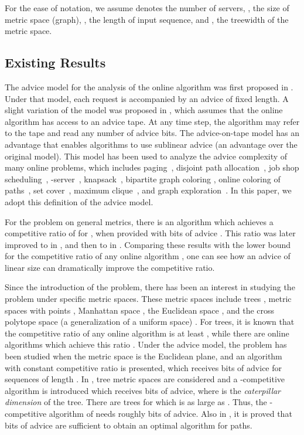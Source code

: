 For the ease of notation, we assume  denotes the number of servers, , the size of metric space (graph), , the length of input sequence, and , the treewidth of the metric space. 

\subsection{Existing Results}

The advice model for the analysis of the online algorithm was first proposed in \cite{Emek2011}. Under that model, each request is accompanied by an advice of fixed length. A slight variation of the model was proposed in \cite{ISSAC09,Bock11}, which assumes that the online algorithm has access to an advice tape. At any time step, the algorithm may refer to the tape and read any number of advice bits. 
The advice-on-tape model has an advantage that enables algorithms to use sublinear advice (an advantage over the original model). This model has been used to analyze the advice complexity of many online problems, which includes paging~\cite{ISSAC09,MFCS10,SOFSEM11}, 
disjoint path allocation~\cite{ISSAC09}, job shop scheduling~\cite{ISSAC09,SOFSEM11}, -server~\cite{Bock11}, knapsack~\cite{LATIN12}, bipartite graph coloring \cite{COCOON12}, online coloring of paths~\cite{LATA12}, 
set cover~\cite{CSR12,ECCC12}, maximum clique~\cite{ECCC12}, and graph exploration~\cite{SIROCCO12}. In this paper, we adopt this definition of the advice model.

For the \kc problem on general metrics, there is an algorithm which achieves a competitive ratio of  for , when provided with  bits of advice \cite{Emek2011}. This ratio was later improved to  in \cite{Bock11}, and then to  in \cite{WAOA11}. Comparing these results with the lower bound  for the competitive ratio of any online algorithm \cite{Mana88}, one can see how an advice of linear size can dramatically improve the competitive ratio. 

Since the introduction of the \kc problem, there has been an interest in studying the problem under specific metric spaces. These metric spaces include trees \cite{Chrob91}, metric spaces with  points \cite{Bart00}, Manhattan space \cite{Bein02}, the Euclidean space \cite{Bein02}, and the cross polytope space (a generalization of a uniform space) \cite{Bein07}. For trees, it is known that the competitive ratio of any online algorithm is at least , while there are online algorithms which achieve this ratio \cite{Chrob91}. Under the advice model, the \kc problem has been studied when the metric space is the Euclidean plane, and an algorithm with constant competitive ratio is presented, which receives  bits of advice for sequences of length  \cite{Bock11}. In \cite{WAOA11}, tree metric spaces are considered and a -competitive algorithm is introduced which receives  bits of advice, where  is the \textit{caterpillar dimension} of the tree. There are trees for which  is as large as . Thus, the -competitive algorithm of \cite{WAOA11} needs roughly  bits of advice. Also in \cite{WAOA11}, it is proved that  bits of advice are sufficient to obtain an optimal algorithm for paths.

